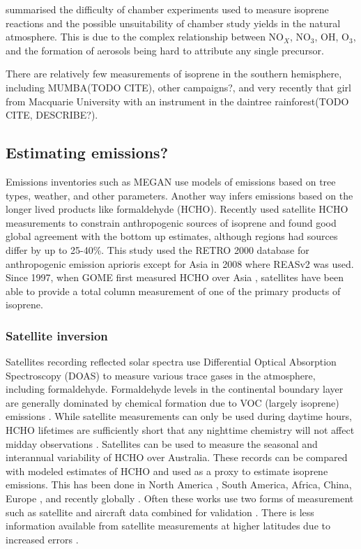     
    \cite{Kanakidou2005} summarised the difficulty of chamber experiments used to measure isoprene reactions and the possible unsuitability of chamber study yields in the natural atmosphere.
    This is due to the complex relationship between NO$_X$, NO$_3$, OH, O$_3$, and the formation of aerosols being hard to attribute any single precursor.
    
    
    
    There are relatively few measurements of isoprene in the southern hemisphere, including MUMBA(TODO CITE), other campaigns?, and very recently that girl from Macquarie University with an instrument in the daintree rainforest(TODO CITE, DESCRIBE?).
    
  
  \subsection{Estimating emissions?}
    
    Emissions inventories such as MEGAN use models of emissions based on tree types, weather, and other parameters.    
    Another way infers emissions based on the longer lived products like formaldehyde (HCHO).
    Recently \cite{Stavrakou2015} used satellite HCHO measurements to constrain anthropogenic sources of isoprene and found good global agreement with the bottom up estimates, although regions had sources differ by up to 25-40\%. 
    This study used the RETRO 2000 database for anthropogenic emission aprioris except for Asia in 2008 where REASv2 was used. 
    Since 1997, when GOME first measured HCHO over Asia \citep{Thomas1998}, satellites have been able to provide a total column measurement of one of the primary products of isoprene.
    
    \subsubsection{Satellite inversion}
	    Satellites recording reflected solar spectra use Differential Optical Absorption Spectroscopy (DOAS) to measure various trace gases in the atmosphere, including formaldehyde. 
	    Formaldehyde levels in the continental boundary layer are generally dominated by chemical formation due to VOC (largely isoprene) emissions \citep{Kefauver2014}.
	    While satellite measurements can only be used during daytime hours, HCHO lifetimes are sufficiently short that any nighttime chemistry will not affect midday observations \citep{Wolfe2016}.
	    Satellites can be used to measure the seasonal and interannual variability of HCHO over Australia.
	    These records can be compared with modeled estimates of HCHO and used as a proxy to estimate isoprene emissions.
	    This has been done in North America \citep{Palmer2003, Millet2006}, South America, Africa, China, Europe \citep{Dufour2009}, and recently globally \citep{FortemsCheiney2012, Bauwens2016}.
	    Often these works use two forms of measurement such as satellite and aircraft data combined for validation \citep{Marais2014}.
	    There is less information available from satellite measurements at higher latitudes due to increased errors \citep{DeSmedt2015}.
	    
